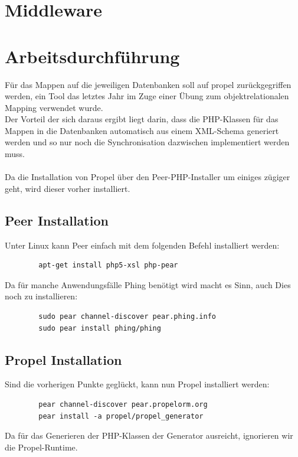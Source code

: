 \documentclass[a4paper]{article}
\begin{document}
	\newpage
	\section{Middleware}
	\section{Arbeitsdurchführung}
	Für das Mappen auf die jeweiligen Datenbanken soll auf propel zurückgegriffen werden, ein Tool das letztes Jahr im Zuge einer Übung zum objektrelationalen Mapping verwendet wurde.\\
	Der Vorteil der sich daraus ergibt liegt darin, dass die PHP-Klassen für das Mappen in die Datenbanken automatisch aus einem XML-Schema generiert werden und so nur noch die Synchronisation dazwischen implementiert werden muss.\\
	\\
	Da die Installation von Propel über den Peer-PHP-Installer um einiges zügiger geht, wird dieser vorher installiert.
	
	\subsection{Peer Installation}
	Unter Linux kann Peer einfach mit dem folgenden Befehl installiert werden:
	\begin{lstlisting}
		apt-get install php5-xsl php-pear
	\end{lstlisting}
	Da für manche Anwendungsfälle Phing benötigt wird macht es Sinn, auch Dies noch zu installieren:
	\begin{lstlisting}
		sudo pear channel-discover pear.phing.info
		sudo pear install phing/phing
	\end{lstlisting}
	\subsection{Propel Installation}
	Sind die vorherigen Punkte geglückt, kann nun Propel installiert werden:
	\begin{lstlisting}
		pear channel-discover pear.propelorm.org
		pear install -a propel/propel_generator
	\end{lstlisting}
	Da für das Generieren der PHP-Klassen der Generator ausreicht, ignorieren wir die Propel-Runtime.
	
\end{document}
